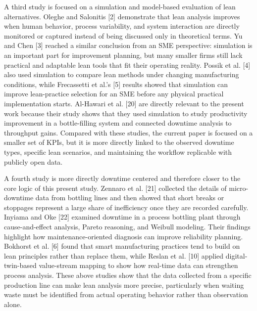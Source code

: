 \documentclass[12pt,a4paper]{article}
\begin{document}
A third study is focused on a simulation and model-based evaluation of lean alternatives. Oleghe and Salonitis [2] demonstrate that lean analysis improves when human behavior, process variability, and system interaction are directly monitored or captured instead of being discussed only in theoretical terms. Yu and Chen [3] reached a similar conclusion from an SME perspective: simulation is an important part for improvement planning, but many smaller firms still lack practical and adaptable lean tools that fit their operating reality. Possik et al. [4] also used simulation to compare lean methods under changing manufacturing conditions, while Frecassetti et al.'s [5] results showed that simulation can improve lean-practice selection for an SME before any physical practical implementation starts. Al-Hawari et al. [20] are directly relevant to the present work because their study shows that they used simulation to study productivity improvement in a bottle-filling system and connected downtime analysis to throughput gains. Compared with these studies, the current paper is focused on a smaller set of KPIs, but it is more directly linked to the observed downtime types, specific lean scenarios, and maintaining the workflow replicable with publicly open data.

A fourth study is more directly downtime centered and therefore closer to the core logic of this present study. Zennaro et al. [21] collected the details of micro-downtime data from bottling lines and then showed that short breaks or stoppages represent a large share of inefficiency once they are recorded carefully. Inyiama and Oke [22] examined downtime in a process bottling plant through cause-and-effect analysis, Pareto reasoning, and Weibull modeling. Their findings highlight how maintenance-oriented diagnosis can improve reliability planning. Bokhorst et al. [6] found that smart manufacturing practices tend to build on lean principles rather than replace them, while Reslan et al. [10] applied digital-twin-based value-stream mapping to show how real-time data can strengthen process analysis. These above studies show that the data collected from a specific production line can make lean analysis more precise, particularly when waiting waste must be identified from actual operating behavior rather than observation alone.
\end{document}
